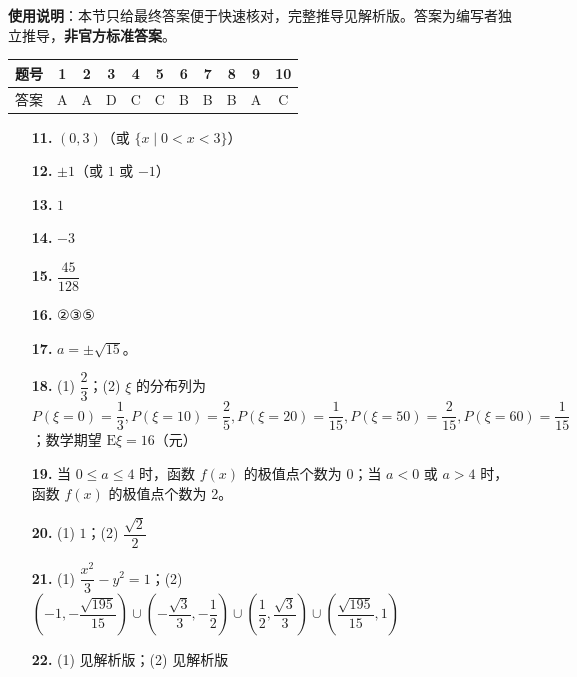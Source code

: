 
\begin{gknotice}
\textbf{使用说明}：本节只给最终答案便于快速核对，完整推导见解析版。答案为编写者独立推导，\textbf{非官方标准答案}。
\end{gknotice}

\begin{center}\begin{tabular}{ccccccccccc}
\toprule
题号 & 1 & 2 & 3 & 4 & 5 & 6 & 7 & 8 & 9 & 10 \\
\midrule
答案 & A & A & D & C & C & B & B & B & A & C \\
\bottomrule
\end{tabular}\end{center}

\begin{itemize}[leftmargin=2.6em]
  \item[\textbf{11.}] $(0, 3)$（或 $\{x \mid 0 < x < 3\}$）
  \item[\textbf{12.}] $\pm 1$（或 $1$ 或 $-1$）
  \item[\textbf{13.}] $1$
  \item[\textbf{14.}] $-3$
  \item[\textbf{15.}] $\dfrac{45}{128}$
  \item[\textbf{16.}] ②③⑤
\end{itemize}

\begin{itemize}[leftmargin=2.6em]
  \item[\textbf{17.}] $a = \pm\sqrt{15}$。
  \item[\textbf{18.}] (1) $\dfrac{2}{3}$；(2) $\xi$ 的分布列为 $P(\xi=0)=\dfrac{1}{3}, P(\xi=10)=\dfrac{2}{5}, P(\xi=20)=\dfrac{1}{15}, P(\xi=50)=\dfrac{2}{15}, P(\xi=60)=\dfrac{1}{15}$；数学期望 $\mathrm{E}\xi = 16$（元）
  \item[\textbf{19.}] 当 $0 \leqslant a \leqslant 4$ 时，函数 $f(x)$ 的极值点个数为 0；当 $a < 0$ 或 $a > 4$ 时，函数 $f(x)$ 的极值点个数为 2。
  \item[\textbf{20.}] (1) $1$；(2) $\dfrac{\sqrt{2}}{2}$
  \item[\textbf{21.}] (1) $\dfrac{x^2}{3} - y^2 = 1$；(2) $\left(-1, -\dfrac{\sqrt{195}}{15}\right) \cup \left(-\dfrac{\sqrt{3}}{3}, -\dfrac{1}{2}\right) \cup \left(\dfrac{1}{2}, \dfrac{\sqrt{3}}{3}\right) \cup \left(\dfrac{\sqrt{195}}{15}, 1\right)$
  \item[\textbf{22.}] (1) 见解析版；(2) 见解析版
\end{itemize}
